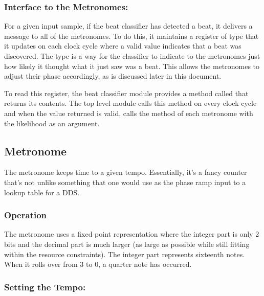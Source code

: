 \documentclass[letterpaper]{article}
\begin{document}
        \subsubsection{Interface to the Metronomes: }
        \label{sec:bc:metif}

        For a given input sample, if the beat classifier has detected a beat,
        it delivers a message to all of the metronomes.  To do this, it
        maintains a register of type  that it
        updates on each clock cycle where a valid value indicates that a beat
        was discovered.  The  type is a way for the
        classifier to indicate to the metronomes just how likely it thought
        what it just saw was a beat.  This allows the metronomes to adjust
        their phase accordingly, as is discussed later in this document.

        To read this register, the beat classifier module provides a method
        called  that returns its contents.  The top level module
        calls this method on every clock cycle and when the value returned is
        valid, calls the  method of each metronome with the
        likelihood as an argument.


    \subsection{Metronome}

        The metronome keeps time to a given tempo.  Essentially, it's a fancy
        counter that's not unlike something that one would use as the phase ramp
        input to a lookup table for a DDS.

        \subsubsection{Operation}

        The metronome uses a fixed point representation where the integer part is
        only 2 bits and the decimal part is much larger (as large as possible while
        still fitting within the resource constraints).  The integer part
        represents sixteenth notes.  When it rolls over from 3 to 0, a quarter note
        has occurred.


        \subsubsection{Setting the Tempo: }
\end{document}
